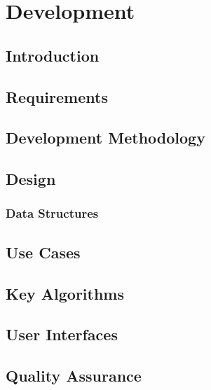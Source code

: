 \chapter{Development}
\section{Introduction}

\section{Requirements}

\section{Development Methodology}

\section{Design}
\subsection{Data Structures}




\section{Use Cases}

\section{Key Algorithms}

\section{User Interfaces}

\section{Quality Assurance}

